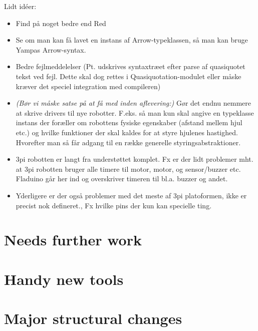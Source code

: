 \documentclass[a4paper, oneside, final]{memoir}
\begin{document}
Lidt idéer:
\begin{itemize}
\item Find på noget bedre end Red 
\item Se om man kan få lavet en instans af Arrow-typeklassen, så man
  kan bruge Yampas Arrow-syntax.
\item Bedre fejlmeddelelser (Pt. udskrives syntaxtræet efter parse af
  quasiquotet tekst ved fejl. Dette skal dog rettes i
  Quasiquotation-modulet eller måske kræver det speciel integration
  med compileren)
\item \textit{(Bør vi måske satse på at få med inden aflevering:)}
  Gør det endnu nemmere at skrive drivers til nye
  robotter. F.eks. så man kun skal angive en typeklasse instans der
  foræller om robottens fysiske egenskaber (afstand mellem hjul etc.)
  og hvilke funktioner der skal kaldes for at styre hjulenes
  hastighed. Hvorefter man så får adgang til en række generelle
  styringsabstraktioner.

\item 3pi robotten er langt fra understøttet komplet. Fx er der lidt problemer
  mht. at 3pi robotten bruger alle timere til motor, motor, og sensor/buzzer
  etc. Fladuino går her ind og overskriver timeren til bl.a. buzzer og andet.

\item  Yderligere er der også problemer med det meste af 3pi platoformen, ikke
  er precist nok defineret., Fx hvilke pins der kun kan specielle ting.
\end{itemize}

\section{Needs further work}

\section{Handy new tools}

\section{Major structural changes}
\end{document}
